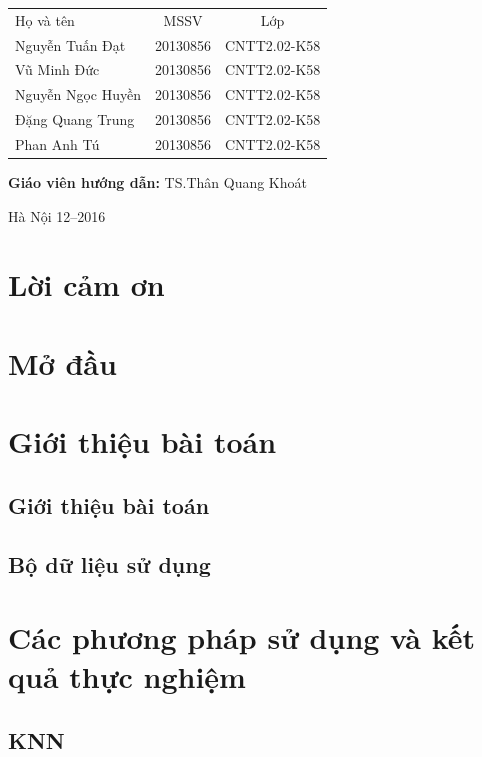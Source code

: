 \documentclass[a4paper,12pt]{report}
\renewcommand{\contentsname}{Mục lục}
\begin{document}
\begin{longtable}{l c c}

Họ và tên & MSSV  & Lớp\\
Nguyễn Tuấn Đạt & 20130856 & CNTT2.02-K58 \\
Vũ Minh Đức & 20130856 & CNTT2.02-K58 \\
Nguyễn Ngọc Huyền & 20130856 & CNTT2.02-K58 \\
Đặng Quang Trung & 20130856 & CNTT2.02-K58 \\
Phan Anh Tú & 20130856 & CNTT2.02-K58 \\

\end{longtable}

\hspace{1cm}\fontsize{14}{16}\selectfont \textbf{Giáo viên hướng dẫn: }TS.Thân Quang Khoát \\[1.5cm]
\begin{center}
\fontsize{16}{19}\selectfont Hà Nội 12--2016

\end{center}
\newpage
\pdfbookmark{\contentsname}{toc}
\tableofcontents
\chapter*{Lời cảm ơn}
{}

\listoffigures
\chapter{Mở đầu}
\chapter{Giới thiệu bài toán}
\section{Giới thiệu bài toán}
\section{Bộ dữ liệu sử dụng}
\chapter{Các phương pháp sử dụng và kết quả thực nghiệm}
\section{KNN}
\end{document}
